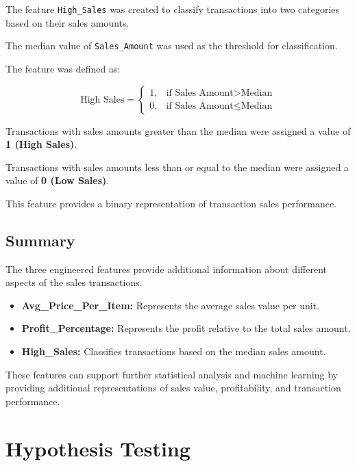 \documentclass[12pt,a4paper]{report}
\begin{document}
The feature \texttt{High\_Sales}
was created to classify transactions
into two categories based on
their sales amounts.

The median value of
\texttt{Sales\_Amount} was used
as the threshold for classification.

The feature was defined as:

\[
\text{High Sales} =
\begin{cases}
1, & \text{if Sales Amount} > \text{Median} \\
0, & \text{if Sales Amount} \leq \text{Median}
\end{cases}
\]

Transactions with sales amounts
greater than the median were
assigned a value of
\textbf{1 (High Sales)}.

Transactions with sales amounts
less than or equal to the median
were assigned a value of
\textbf{0 (Low Sales)}.

This feature provides a binary
representation of transaction
sales performance.


\section{Summary}

The three engineered features
provide additional information
about different aspects of
the sales transactions.

\begin{itemize}

    \item \textbf{Avg\_Price\_Per\_Item:}
    Represents the average sales
    value per unit.

    \item \textbf{Profit\_Percentage:}
    Represents the profit relative
    to the total sales amount.

    \item \textbf{High\_Sales:}
    Classifies transactions based
    on the median sales amount.

\end{itemize}

These features can support
further statistical analysis
and machine learning by providing
additional representations of
sales value, profitability,
and transaction performance.

\endgroup

\chapter{Hypothesis Testing}
\end{document}
